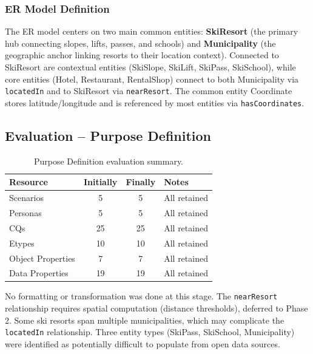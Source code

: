 \subsubsection{ER Model Definition}

The ER model centers on two main common entities: \textbf{SkiResort} (the primary hub connecting slopes, lifts, passes, and schools) and \textbf{Municipality} (the geographic anchor linking resorts to their location context). Connected to SkiResort are contextual entities (SkiSlope, SkiLift, SkiPass, SkiSchool), while core entities (Hotel, Restaurant, RentalShop) connect to both Municipality via \texttt{locatedIn} and to SkiResort via \texttt{nearResort}. The common entity Coordinate stores latitude/longitude and is referenced by most entities via \texttt{hasCoordinates}.

\subsection{Evaluation -- Purpose Definition}

\begin{table}[h!]
\centering
\small
\begin{tabular}{|l|c|c|l|}
\hline
\textbf{Resource} & \textbf{Initially} & \textbf{Finally} & \textbf{Notes} \\
\hline
Scenarios & 5 & 5 & All retained \\
Personas & 5 & 5 & All retained \\
CQs & 25 & 25 & All retained \\
Etypes & 10 & 10 & All retained \\
Object Properties & 7 & 7 & All retained \\
Data Properties & 19 & 19 & All retained \\
\hline
\end{tabular}
\caption{Purpose Definition evaluation summary.}
\label{tab:purpose-eval}
\end{table}

\noindent No formatting or transformation was done at this stage. The \texttt{nearResort} relationship requires spatial computation (distance thresholds), deferred to Phase 2. Some ski resorts span multiple municipalities, which may complicate the \texttt{locatedIn} relationship. Three entity types (SkiPass, SkiSchool, Municipality) were identified as potentially difficult to populate from open data sources.
